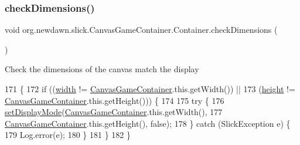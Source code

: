\subsubsection{\texorpdfstring{check\+Dimensions()}{checkDimensions()}}
{\footnotesize\ttfamily void org.\+newdawn.\+slick.\+Canvas\+Game\+Container.\+Container.\+check\+Dimensions (\begin{DoxyParamCaption}{ }\end{DoxyParamCaption})\hspace{0.3cm}{\ttfamily [inline]}}

Check the dimensions of the canvas match the display 
\begin{DoxyCode}
171                                       \{
172             \textcolor{keywordflow}{if} ((\mbox{\hyperlink{classorg_1_1newdawn_1_1slick_1_1_game_container_a8c65160202b9f5aafde3fcf03e6155c9}{width}} != \mbox{\hyperlink{classorg_1_1newdawn_1_1slick_1_1_canvas_game_container_a078feee2c69d77cabd1f09b87d055923}{CanvasGameContainer}}.this.getWidth()) ||
173                 (\mbox{\hyperlink{classorg_1_1newdawn_1_1slick_1_1_game_container_aac7312a21bbcaabec14be965c683d970}{height}} != \mbox{\hyperlink{classorg_1_1newdawn_1_1slick_1_1_canvas_game_container_a078feee2c69d77cabd1f09b87d055923}{CanvasGameContainer}}.this.getHeight())) \{
174                 
175                 \textcolor{keywordflow}{try} \{
176                     \mbox{\hyperlink{classorg_1_1newdawn_1_1slick_1_1_app_game_container_aa2de68db61ddd3917a8edc0177ebdfe3}{setDisplayMode}}(\mbox{\hyperlink{classorg_1_1newdawn_1_1slick_1_1_canvas_game_container_a078feee2c69d77cabd1f09b87d055923}{CanvasGameContainer}}.this.getWidth(), 
177                                    \mbox{\hyperlink{classorg_1_1newdawn_1_1slick_1_1_canvas_game_container_a078feee2c69d77cabd1f09b87d055923}{CanvasGameContainer}}.this.getHeight(), \textcolor{keyword}{false});
178                 \} \textcolor{keywordflow}{catch} (SlickException e) \{
179                     Log.error(e);
180                 \}
181             \}
182         \}
\end{DoxyCode}
\mbox{\label{classorg_1_1newdawn_1_1slick_1_1_canvas_game_container_1_1_container_a673c1f67eda4f34499c9c98ed68e6b01}} 
